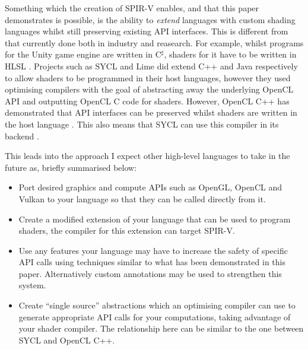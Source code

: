 \documentclass[a4paper,12pt,twoside,openright]{report}
\begin{document}


Something which the creation of SPIR-V enables, and that this paper
demonstrates is possible, is the ability to \textit{extend} languages with
custom shading languages whilst still preserving existing API interfaces. This
is different from that currently done both in industry and reasearch. For
example, whilst programs for the Unity game engine are written in C$^\sharp$,
shaders for it have to be written in HLSL \cite{TODO}. Projects such as SYCL
and Lime did extend C++ and Java respectively to allow shaders to be programmed
in their host languages, however they used optimising compilers with the goal
of abstracting away the underlying OpenCL API and outputting OpenCL C code for
shaders. However, OpenCL C++ has demonstrated that API interfaces can be
preserved whilst shaders are written in the host language
\cite{OpenCLCPPWhitePaper}. This also means that SYCL can use this compiler in
its backend \cite{TODO}.

This leads into the approach I expect other high-level languages to take in the
future as, briefly summarised below:

\begin{itemize}

    \item Port desired graphics and compute APIs such as OpenGL, OpenCL and
    Vulkan to your language so that they can be called directly from it.

    \item Create a modified extension of your language that can be used to
    program shaders, the compiler for this extension can target SPIR-V.

    \item Use any features your language may have to increase the safety of
    specific API calls using techniques similar to what has been demonstrated
    in this paper. Alternatively custom annotations may be used to strengthen
    this system.

    \item Create ``single source'' abstractions which an optimising compiler
    can use to generate appropriate API calls for your computations, taking
    advantage of your shader compiler. The relationship here can be similar to
    the one between SYCL and OpenCL C++.

\end{itemize}
\end{document}
